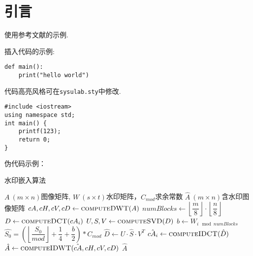 
\section{引言}

使用参考文献的示例\cite{vaswani2017attention}\cite{DBLP:journals/corr/abs-1802-05751}\cite{mott2019towards}\cite{silver2016mastering}.

插入代码的示例:

\begin{lstlisting}[style=sysupython]
def main():
    print("hello world")
\end{lstlisting}
代码高亮风格可在\texttt{sysulab.sty}中修改.
\begin{lstlisting}[style=sysucpp]
#include <iostream>
using namespace std;
int main() {
    printf(123);
    return 0;
}
\end{lstlisting}

伪代码示例：


\begin{algorithm}[!htbp]
    \caption{水印嵌入算法}
    \label{algo:embed}
    \begin{algorithmic}[1] %
        \Require $A\ (m\times n)$图像矩阵, $W\ (s\times t)$水印矩阵，$C_{mod}$求余常数
        \Ensure $\hat{A}\ (m\times n)$含水印图像矩阵
        \State $cA, cH, cV, cD \gets \Call{computeDWT}{A} $ 
        \State $numBlocks \gets \left\lfloor\dfrac{m}{8}\right\rfloor\cdot \left\lfloor\dfrac{n}{8}\right\rfloor$ 
         
        \State $D \gets \Call{computeDCT}{cA_i} $ 
        \State $U, S, V \gets \Call{computeSVD}{D}$ 
        \State $b \gets W_{i \mod numBlocks}$ 
        \State $\hat{S_0} = \left(\left\lfloor\dfrac{S_0}{mod}\right\rfloor + \dfrac{1}{4} + \dfrac{b}{2} \right) * C_{mod}$ 
        \State $\hat{D} \gets U \cdot \hat{S} \cdot V^T$ 
        \State $\hat{cA_i} \gets \Call{computeIDCT}{\hat{D}}$ 
        \EndParFor
        \State $\hat{A} \gets \Call{computeIDWT}{\hat{cA}, cH, cV, cD}$ 
        \State \Return $\hat{A}$
        \EndFunction
    \end{algorithmic}
\end{algorithm}
